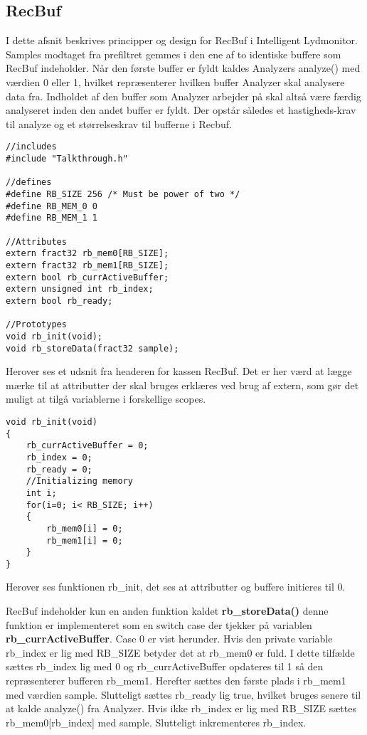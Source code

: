 \subsection{RecBuf}
I dette afsnit beskrives principper og design for RecBuf i Intelligent Lydmonitor.
Samples modtaget fra prefiltret gemmes i den ene af to identiske buffere som RecBuf indeholder. Når den første buffer er fyldt kaldes Analyzers analyze() med værdien 0 eller 1, hvilket repræsenterer hvilken buffer Analyzer skal analysere data fra. Indholdet af den buffer som Analyzer arbejder på skal altså være færdig analyseret inden den andet buffer er fyldt. Der opstår således et hastigheds-krav til analyze og et størrelseskrav til bufferne i Recbuf. 

\begin{verbatim}
//includes
#include "Talkthrough.h"

//defines
#define RB_SIZE 256 /* Must be power of two */
#define RB_MEM_0 0
#define RB_MEM_1 1

//Attributes
extern fract32 rb_mem0[RB_SIZE];
extern fract32 rb_mem1[RB_SIZE];
extern bool rb_currActiveBuffer;
extern unsigned int rb_index;
extern bool rb_ready;

//Prototypes
void rb_init(void);
void rb_storeData(fract32 sample);
\end{verbatim}

Herover ses et udsnit fra headeren for kassen RecBuf. Det er her værd at lægge mærke til at attributter der skal bruges erklæres ved brug af extern, som gør det muligt at tilgå variablerne i forskellige scopes. 

\begin{verbatim}
void rb_init(void)
{
    rb_currActiveBuffer = 0;
    rb_index = 0;
    rb_ready = 0;
    //Initializing memory
    int i;
    for(i=0; i< RB_SIZE; i++)
    {
        rb_mem0[i] = 0;
        rb_mem1[i] = 0;
    }
}
\end{verbatim}

Herover ses funktionen rb\_init, det ses at attributter og buffere initieres til 0.

RecBuf indeholder kun en anden funktion kaldet \textbf{rb\_storeData()} denne funktion er implementeret som en switch case der tjekker på variablen \textbf{rb\_currActiveBuffer}. Case 0 er vist herunder. 
Hvis den private variable rb\_index er lig med RB\_SIZE betyder det at rb\_mem0 er fuld. I dette tilfælde sættes rb\_index lig med 0 og rb\_currActiveBuffer opdateres til 1 så den repræsenterer bufferen rb\_mem1. Herefter sættes den første plads i rb\_mem1 med værdien sample. Slutteligt sættes rb\_ready lig true, hvilket bruges senere til at kalde analyze() fra Analyzer. Hvis ikke rb\_index er lig med RB\_SIZE sættes rb\_mem0[rb\_index] med sample. Slutteligt inkrementeres rb\_index. 

